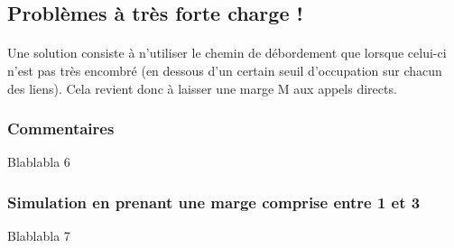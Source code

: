 %
        \subsection{Problèmes à très forte charge !}
            \paragraph{}
Une solution consiste à n'utiliser le chemin de débordement que lorsque celui-ci n'est pas très encombré (en dessous d'un certain seuil d'occupation sur chacun des liens).
Cela revient donc à laisser une marge M aux appels directs.
%
            \subsubsection{Commentaires}
Blablabla 6
%
            \subsubsection{Simulation en prenant une marge comprise entre 1 et 3}
Blablabla 7

%
    \clearpage
%
